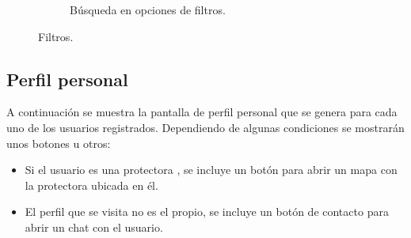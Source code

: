 \documentclass[a4paper, 12pt]{article}
\begin{document}
\begin{figure}[H]
\begin{subfigure}{0.48\textwidth}
\begin{center}
			\caption{Búsqueda en opciones de filtros.}
		\end{center}  
	\end{subfigure}\hfill
	\caption{Filtros.}
\end{figure}

\newpage
\subsection*{Perfil personal}

A continuación se muestra la pantalla de perfil personal que se genera para cada uno de los usuarios registrados. Dependiendo de algunas condiciones se mostrarán unos botones u otros:
\begin{itemize}
	\item Si el usuario es una protectora , se incluye un botón para abrir un mapa con la protectora ubicada en él.
	\item El perfil que se visita no es el propio, se incluye un botón de contacto para abrir un chat con el usuario.
\end{itemize}
\end{document}
